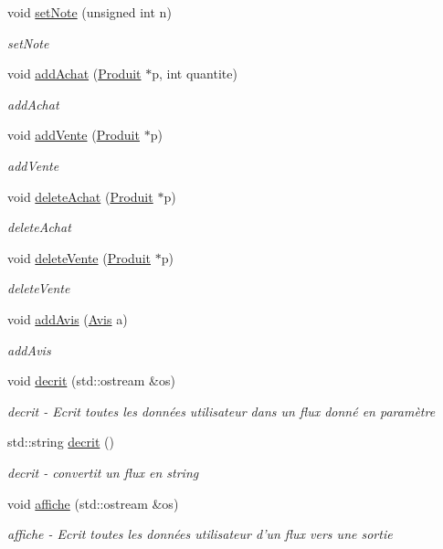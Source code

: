 \begin{DoxyCompactItemize}
void \hyperlink{class_utilisateur_a703b2dbde2ba4e30fceefa651d4ab51f}{set\-Note} (unsigned int n)
\begin{DoxyCompactList}\small\item\em set\-Note \end{DoxyCompactList}\item 
void \hyperlink{class_utilisateur_aa38d52a678907e9159417a162970b7da}{add\-Achat} (\hyperlink{class_produit}{Produit} $\ast$p, int quantite)
\begin{DoxyCompactList}\small\item\em add\-Achat \end{DoxyCompactList}\item 
void \hyperlink{class_utilisateur_ac388127f7ea147a70a67ff6345ccb164}{add\-Vente} (\hyperlink{class_produit}{Produit} $\ast$p)
\begin{DoxyCompactList}\small\item\em add\-Vente \end{DoxyCompactList}\item 
void \hyperlink{class_utilisateur_abe5d38ac1992f3db28b29f985be40ff9}{delete\-Achat} (\hyperlink{class_produit}{Produit} $\ast$p)
\begin{DoxyCompactList}\small\item\em delete\-Achat \end{DoxyCompactList}\item 
void \hyperlink{class_utilisateur_a55a91e468128dd5bacc995c3c91e4000}{delete\-Vente} (\hyperlink{class_produit}{Produit} $\ast$p)
\begin{DoxyCompactList}\small\item\em delete\-Vente \end{DoxyCompactList}\item 
void \hyperlink{class_utilisateur_aa8b2cad2349702cf2fa8f23fef2e5a9d}{add\-Avis} (\hyperlink{class_avis}{Avis} a)
\begin{DoxyCompactList}\small\item\em add\-Avis \end{DoxyCompactList}\item 
void \hyperlink{class_utilisateur_ad4c1dbab122bf719cf1419b9d93a0e22}{decrit} (std\-::ostream \&os)
\begin{DoxyCompactList}\small\item\em decrit -\/ Ecrit toutes les données utilisateur dans un flux donné en paramètre \end{DoxyCompactList}\item 
std\-::string \hyperlink{class_utilisateur_a938eda997ac76805b7674c7ffe7e17e8}{decrit} ()
\begin{DoxyCompactList}\small\item\em decrit -\/ convertit un flux en string \end{DoxyCompactList}\item 
void \hyperlink{class_utilisateur_a810f877d63ef4b8b2f6b18dfc1cd26f9}{affiche} (std\-::ostream \&os)
\begin{DoxyCompactList}\small\item\em affiche -\/ Ecrit toutes les données utilisateur d'un flux vers une sortie \end{DoxyCompactList}\end{DoxyCompactItemize}
